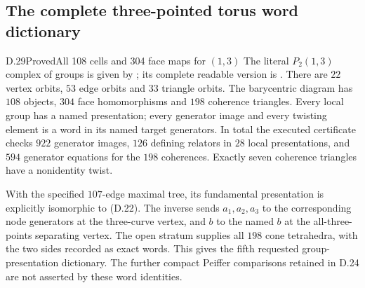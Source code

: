 \subsection{The complete three-pointed torus word dictionary}

\begin{result}{D.29}{Proved}{All 108 cells and 304 face maps for $(1,3)$}
The literal $P_2(1,3)$ complex of groups is given by
; its complete readable
version is .
There are $22$ vertex orbits, $53$ edge orbits and $33$
triangle orbits.  The barycentric diagram has $108$ objects,
$304$ face homomorphisms and $198$ coherence triangles.
Every local group has a named presentation; every generator
image and every twisting element is a word in its named
target generators.  In total the executed certificate checks
$922$ generator images, $126$ defining relators in $28$
local presentations, and $594$ generator equations for the
$198$ coherences.  Exactly seven coherence triangles have
a nonidentity twist.

With the specified $107$-edge maximal tree, its fundamental
presentation is explicitly isomorphic to (D.22).
The inverse sends $a_1,a_2,a_3$ to the corresponding node
generators at the three-curve vertex, and $b$ to the named
$b$ at the all-three-points separating vertex.
The open stratum supplies all $198$ cone tetrahedra,
with the two sides recorded as exact words.  This gives
the fifth requested group-presentation dictionary.
The further compact Peiffer comparisons retained in
D.24 are not asserted by these word identities.
\end{result}
